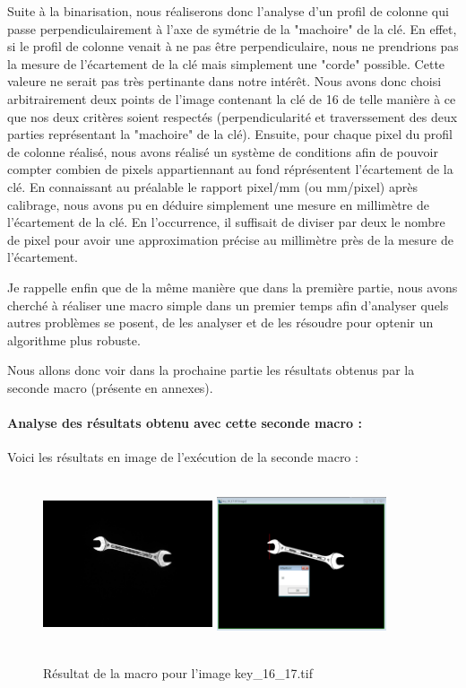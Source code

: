 \documentclass{scrreprt}
\begin{document}
Suite à la binarisation, nous réaliserons donc l'analyse d'un profil de colonne qui passe perpendiculairement à l'axe de symétrie 
de la "machoire" de la clé. En effet, si le profil de colonne venait à ne pas être perpendiculaire, nous ne prendrions pas la mesure 
de l'écartement de la clé mais simplement une "corde" possible. Cette valeure ne serait pas très pertinante dans notre intérêt. 
Nous avons donc choisi arbitrairement deux points de l'image contenant la clé de 16 de telle manière à ce que nos deux critères soient respectés
(perpendicularité et traverssement des deux parties représentant la "machoire" de la clé). Ensuite, pour chaque pixel du profil de colonne réalisé, 
nous avons réalisé un système de conditions afin de pouvoir compter combien de pixels appartiennant au fond réprésentent l'écartement de la clé. 
En connaissant au préalable le rapport pixel/mm (ou mm/pixel) après calibrage, nous avons pu en déduire simplement une mesure en millimètre de
l'écartement de la clé. En l'occurrence, il suffisait de diviser par deux le nombre de pixel pour avoir une approximation précise au millimètre près 
de la mesure de l'écartement.    

Je rappelle enfin que de la même manière que dans la première partie, nous avons cherché à réaliser une macro simple dans un premier temps
afin d'analyser quels autres problèmes se posent, de les analyser et de les résoudre pour optenir un algorithme plus robuste. 

Nous allons donc voir dans la prochaine partie les résultats obtenus par la seconde macro (présente en annexes). 

\paragraph{Analyse des résultats obtenu avec cette seconde macro : }

Voici les résultats en image de l'exécution de la seconde macro : 

\begin{figure}[!h]
\centering
\includegraphics[width=5cm, height=5cm]{images/key1617.png}\hfill
\includegraphics[width=5cm, height=5cm]{images/key16.png}
\caption{Résultat de la macro pour l'image key_16_17.tif}
\end{figure}
\end{document}
